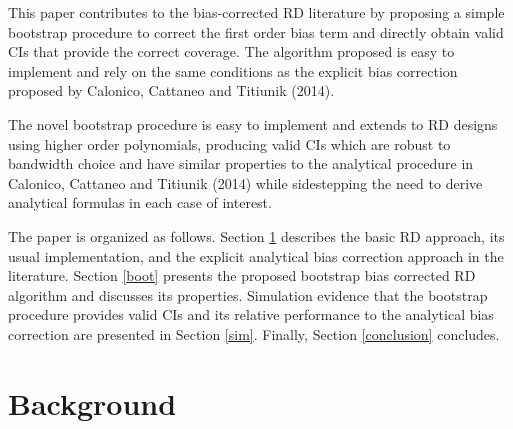\documentclass[12pt,fleqn]{article}
\begin{document}
This paper contributes to the bias-corrected RD literature by proposing a simple
bootstrap procedure to correct the first order bias term and directly obtain 
valid CIs that provide the correct coverage. The algorithm proposed is easy to
implement and rely on the same conditions as the explicit bias correction
proposed by Calonico, Cattaneo and Titiunik (2014).

The novel bootstrap procedure is easy to implement and extends to RD designs 
using higher order polynomials, producing valid CIs which are robust to 
bandwidth choice and have similar properties to the analytical procedure in 
Calonico, Cattaneo and Titiunik (2014) while sidestepping the need to derive 
analytical formulas in each case of interest.

The paper is organized as follows. Section \ref{background} describes the basic
RD approach, its usual implementation, and the explicit analytical bias 
correction approach in the literature. Section \ref{boot} presents the proposed 
bootstrap bias corrected RD algorithm and discusses its properties. Simulation
evidence that the bootstrap procedure provides valid CIs and its relative 
performance to the analytical bias correction are presented in Section \ref{sim}.
Finally, Section \ref{conclusion} concludes.

\section{Background}\label{background}
\end{document}
